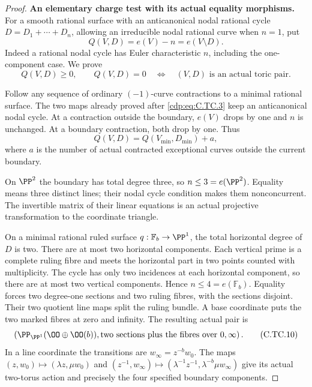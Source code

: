 \begin{proof}
\par\medskip\noindent\textbf{An elementary charge test with its actual equality morphisms.}
For a smooth rational surface with an
anticanonical nodal rational cycle
$D=D_1+\cdots+D_n$, allowing an
irreducible nodal rational curve when
$n=1$, put
\[
                        Q(V,D)=e(V)-n=e(V\setminus D).
\tag{C.TC.7}\label{cdp:eq:C.TC.7}
\]
Indeed a rational nodal cycle has
Euler characteristic $n$, including
the one-component case. We prove
\[
 Q(V,D)\ge0,\qquad Q(V,D)=0
       \quad\Longleftrightarrow\quad
       (V,D)\text{ is an actual toric pair}.
\tag{C.TC.8}\label{cdp:eq:C.TC.8}
\]

Follow any sequence of ordinary
$(-1)$-curve contractions to a
minimal rational surface. The two
maps already proved after \eqref{cdp:eq:C.TC.3}
keep an anticanonical nodal cycle.
At a contraction outside the boundary,
$e(V)$ drops by one and $n$ is
unchanged. At a boundary contraction,
both drop by one. Thus
\[
 Q(V,D)=Q(V_{\min},D_{\min})+a,
\tag{C.TC.9}\label{cdp:eq:C.TC.9}
\]
where $a$ is the number of actual
contracted exceptional curves outside
the current boundary.

On $\PP^2$ the boundary has total
degree three, so $n\le3=e(\PP^2)$.
Equality means three distinct lines;
their nodal cycle condition makes
them nonconcurrent. The invertible
matrix of their linear equations is
an actual projective transformation
to the coordinate triangle.

On a minimal rational ruled surface
$q:\mathbb F_b\to\PP^1$, the total
horizontal degree of $D$ is two.
There are at most two horizontal
components. Each vertical prime is
a complete ruling fibre and meets
the horizontal part in two points
counted with multiplicity. The cycle
has only two incidences at each
horizontal component, so there are
at most two vertical components.
Hence $n\le4=e(\mathbb F_b)$.
Equality forces two degree-one
sections and two ruling fibres,
with the sections disjoint.
Their two quotient line maps split
the ruling bundle. A base coordinate
puts the two marked fibres at zero
and infinity. The resulting actual
pair is
\[
 \left(\PP_{\PP^1}(\OO\oplus\OO(b)),
        \text{two sections plus the fibres over }0,\infty\right).
\tag{C.TC.10}\label{cdp:eq:C.TC.10}
\]
In a line coordinate the transitions
are $w_\infty=z^{-b}w_0$.
The maps $(z,w_0)\mapsto(\lambda z,\mu w_0)$
and $(z^{-1},w_\infty)\mapsto
(\lambda^{-1}z^{-1},\lambda^{-b}\mu w_\infty)$
give its actual two-torus action
and precisely the four specified
boundary components.


\end{proof}
